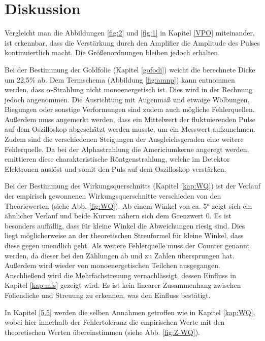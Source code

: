 \section{Diskussion}
Vergleicht man die Abbildungen \ref{fig:2} und \ref{fig:1} in Kapitel \ref{VPO} miteinander,
ist erkennbar, dass die Verstärkung durch den Amplifier die Amplitude des Pulses
kontinuiertlich macht.
Die Größenordnungen bleiben jedoch erhalten.

Bei der Bestimmung der Goldfolie (Kapitel \ref{gofodi}) weicht die berechnete Dicke um 22,5\% ab.
Dem Termschema (Abbildung \ref{fig:amnp}) kann entnommen werden, dass $\alpha$-Strahlung nicht monoenergetisch ist.
Dies wird in der Rechnung jedoch angenommen.
Die Ausrichtung mit Augenmaß und etwaige Wölbungen, Biegungen oder sonstige Verformungen sind zudem auch mögliche Fehlerquellen.
Außerdem muss angemerkt werden, dass ein Mittelwert der fluktuierenden Pulse auf dem Oszilloskop abgeschätzt werden musste, um ein Messwert aufzunehmen.
Zudem sind die verschiedenen Steigungen der Ausgleichsgeraden eine weitere Fehlerquelle.
Da bei der Alphastrahlung die Americiumkerne angeregt werden, emittieren diese charakteristische Röntgenstrahlung,
welche im Detektor Elektronen auslöst und somit den Puls auf dem Oszilloskop verstärken.

Bei der Bestimmung des Wirkungsquerschnitts (Kapitel \ref{kap:WQ}) ist der Verlauf der empirisch gewonnenen Wirkungsquerschnitte verschieden von den Theoriewerten (siehe Abb. \ref{fig:WQ}).
Ab einem Winkel von ca. 5° zeigt sich ein ähnlicher Verlauf und beide Kurven nähern sich dem Grenzwert 0.
Es ist besonders auffällig, dass für kleine Winkel die Abweichungen riesig sind.
Dies liegt möglicherweise an der theoretischen Streuformel für kleine Winkel, dass diese gegen unendlich geht.
Als weitere Fehlerquelle muss der Counter genannt werden, da dieser bei den Zählungen ab und zu Zahlen übersprungen hat.
Außerdem wird wieder von monoenergetischen Teilchen ausgegangen.
Anschließend wird die Mehrfachstreuung vernachlässigt, dessen Einfluss in Kapitel \ref{kap:mfs} gezeigt wird.
Es ist kein linearer Zusammenhang zwischen Foliendicke und Streuung zu erkennen, was den Einfluss bestätigt.

In Kapitel \ref{5.5} werden die selben Annahmen getroffen wie in Kapitel \ref{kap:WQ},
wobei hier innerhalb der Fehlertoleranz die empirischen Werte mit den theoretischen Werten übereinstimmen (siehe Abb. \ref{fig:Z-WQ}).
